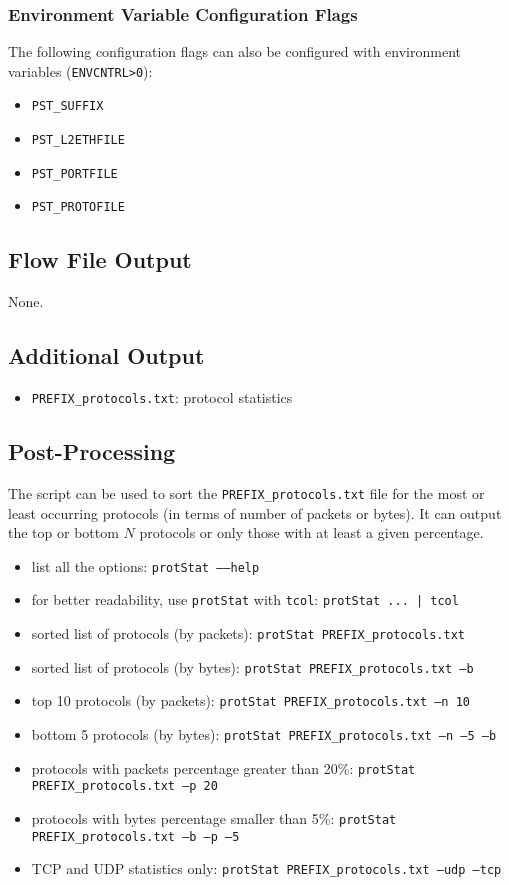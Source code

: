 \documentclass[documentation]{subfiles}
\begin{document}
\subsubsection{Environment Variable Configuration Flags}
The following configuration flags can also be configured with environment variables ({\tt ENVCNTRL>0}):
\begin{itemize}
    \item {\tt PST\_SUFFIX}
    \item {\tt PST\_L2ETHFILE}
    \item {\tt PST\_PORTFILE}
    \item {\tt PST\_PROTOFILE}
\end{itemize}

\subsection{Flow File Output}
None.

\subsection{Additional Output}
\begin{itemize}
    \item {\tt PREFIX\_protocols.txt}: protocol statistics
\end{itemize}

\subsection{Post-Processing}
The {\tt{}} script can be used to sort the {\tt PREFIX\_protocols.txt} file for the most or least occurring protocols (in terms of number of packets or bytes).
It can output the top or bottom $N$ protocols or only those with at least a given percentage.
\begin{itemize}
    \item list all the options: {\tt protStat --{}--help}
    \item for better readability, use {\tt protStat} with {\tt tcol}: {\tt protStat ... | tcol}
    \item sorted list of protocols (by packets): {\tt protStat PREFIX\_protocols.txt}
    \item sorted list of protocols (by bytes): {\tt protStat PREFIX\_protocols.txt --b}
    \item top 10 protocols (by packets): {\tt protStat PREFIX\_protocols.txt --n 10}
    \item bottom 5 protocols (by bytes): {\tt protStat PREFIX\_protocols.txt --n --5 --b}
    \item protocols with packets percentage greater than 20\%: {\tt protStat PREFIX\_protocols.txt --p 20}
    \item protocols with bytes percentage smaller than 5\%: {\tt protStat PREFIX\_protocols.txt --b --p --5}
    \item TCP and UDP statistics only: {\tt protStat PREFIX\_protocols.txt --udp --tcp}
\end{itemize}
\end{document}
